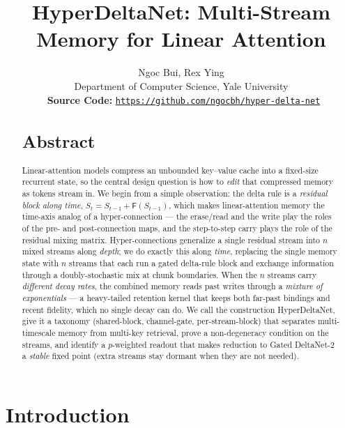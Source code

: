\documentclass[11pt,letterpaper,logo]{yalearxiv}
\title{HyperDeltaNet: Multi-Stream Memory for Linear Attention}
\author{Ngoc Bui\yale, Rex Ying\yale\\
\yale Department of Computer Science, Yale University\\
\faGithub~\textbf{Source Code:} \href{https://github.com/ngocbh/hyper-delta-net}{\texttt{https://github.com/ngocbh/hyper-delta-net}}
}
\newcommand{\Fdelta}{\mathsf{F}}               %
\begin{document}
\begin{abstract}
\vspace{-1mm}
{\centering\section*{Abstract}}
Linear-attention models compress an unbounded key--value cache into a fixed-size
recurrent state, so the central design question is how to \emph{edit} that
compressed memory as tokens stream in. We begin from a simple observation: the
delta rule is a \emph{residual block along time}, $S_t = S_{t-1} +
\Fdelta(S_{t-1})$, which makes linear-attention memory the time-axis analog of a
hyper-connection --- the erase/read and the write play the roles of the pre- and
post-connection maps, and the step-to-step carry plays the role of the residual
mixing matrix. Hyper-connections generalize a single residual stream into $n$
mixed streams along \emph{depth}; we do exactly this along \emph{time}, replacing
the single memory state with $n$ streams that each run a gated delta-rule block
and exchange information through a doubly-stochastic mix at chunk boundaries.
When the $n$ streams carry \emph{different decay rates}, the combined memory reads
past writes through a \emph{mixture of exponentials} --- a heavy-tailed retention
kernel that keeps both far-past bindings and recent fidelity, which no single
decay can do. We call the construction HyperDeltaNet, give it a taxonomy
(shared-block, channel-gate, per-stream-block) that separates multi-timescale
memory from multi-key retrieval, prove a non-degeneracy condition on the streams,
and identify a $p$-weighted readout that makes reduction to Gated DeltaNet-2 a
\emph{stable} fixed point (extra streams stay dormant when they are not needed).
\end{abstract}


\maketitle


\section{Introduction}
\label{sec:intro}
\end{document}
